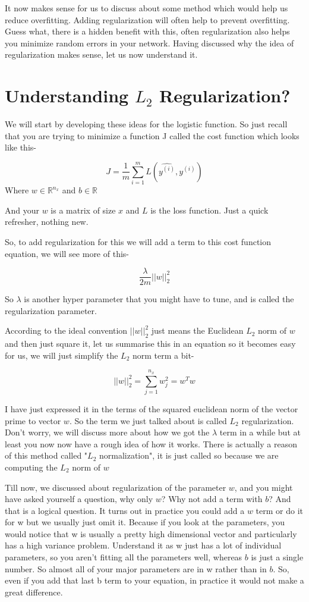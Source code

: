 \documentclass{article}
\begin{document}
It now makes sense for us to discuss about some method which would help us reduce overfitting. Adding regularization will often help to prevent overfitting. Guess what, there is a hidden benefit with this, often regularization also helps you minimize random errors in your network. Having discussed why the idea of regularization makes sense, let us now understand it.

\maketitle
\section{Understanding $L_2$ Regularization?}

We will start by developing these ideas for the logistic function. So just recall that you are trying to minimize a function J called the cost function which looks like this-

$$J = \frac{1}{m} \sum_{i=1}^m L(\hat{y^{(i)}}, y^{(i)})$$
Where $w \in \mathbb{R}^{n_x}$ and $b \in \mathbb{R}$

And your $w$ is a matrix of size $x$ and $L$ is the loss function. Just a quick refresher, nothing new.

So, to add regularization for this we will add a term to this cost function equation, we will see more of this-

$$\frac{\lambda}{2m}||w||^2_2$$

So $\lambda$ is another hyper parameter that you might have to tune, and is called the regularization parameter.

According to the ideal convention $||w||^2_2$ just means the Euclidean $L_2$ norm of $w$ and then just square it, let us summarise this in an equation so it becomes easy for us, we will just simplify the $L_2$ norm term a bit-

$$||w||^2_2 = \sum_{j=1}^{n_x} w_j^2 = w^Tw$$

I have just expressed it in the terms of the squared euclidean norm of the vector prime to vector $w$. So the term we just talked about is called $L_2$ regularization. Don't worry, we will discuss more about how we got the $\lambda$ term in a while but at least you now now have a rough idea of how it works. There is actually a reason of this method called "$L_2$ normalization", it is just called so because we are computing the $L_2$ norm of $w$

Till now, we discussed about regularization of the parameter $w$, and you might have asked yourself a question, why only $w$? Why not add a term with $b$? And that is a logical question. It turns out in practice you could add a $w$ term or do it for w but we usually just omit it. Because if you look at the parameters, you would notice that w is usually a pretty high dimensional vector and particularly has a high variance problem. Understand it as w just has a lot of individual parameters, so you aren't fitting all the parameters well, whereas $b$ is just a single number. So almost all of your major parameters are in w rather than in $b$. So, even if you add that last b term to your equation, in practice it would not make a great difference.
\end{document}
